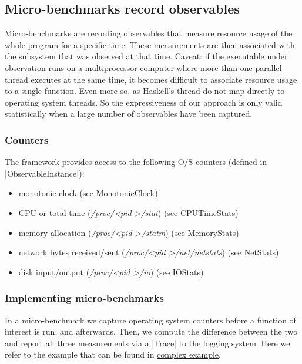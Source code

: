 

\subsection{Micro-benchmarks record observables}\label{sec:mubenchmarks}

Micro-benchmarks are recording observables that measure resource usage of the
whole program for a specific time. These measurements are then associated with
the subsystem that was observed at that time.
Caveat: if the executable under observation runs on a multiprocessor computer
where more than one parallel thread executes at the same time, it becomes
difficult to associate resource usage to a single function. Even more so, as
Haskell's thread do not map directly to operating system threads. So the
expressiveness of our approach is only valid statistically when a large number
of observables have been captured.

\subsubsection{Counters}

The framework provides access to the following O/S counters (defined in |ObservableInstance|):
\\
\begin{itemize}
\item monotonic clock (see MonotonicClock)
\item CPU or total time (\emph{/proc/\textless pid \textgreater/stat}) (see CPUTimeStats)
\item memory allocation (\emph{/proc/\textless pid \textgreater/statm}) (see MemoryStats)
\item network bytes received/sent (\emph{/proc/\textless pid \textgreater/net/netstats}) (see NetStats)
\item disk input/output (\emph{/proc/\textless pid \textgreater/io}) (see IOStats)
\end{itemize}

\subsubsection{Implementing micro-benchmarks}

In a micro-benchmark we capture operating system counters before a function of
interest is run, and afterwards. Then, we compute the difference between the
two and report all three measurements via a |Trace| to the logging system.
Here we refer to the example that can be found in \hyperref[sec:examplecomplex]{complex example}.

